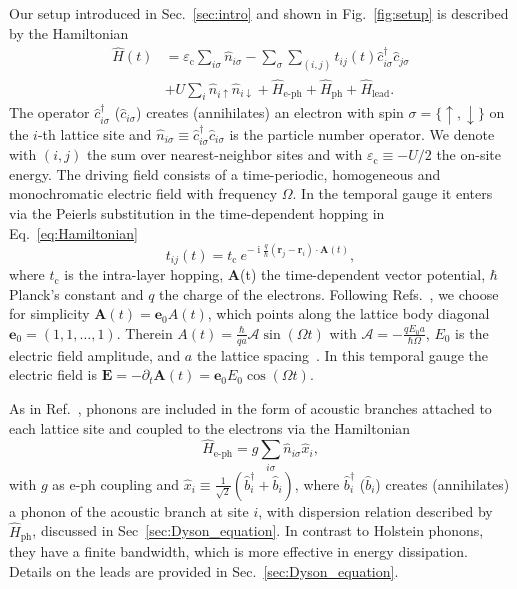 \documentclass[aps,prb,groupedaddress,showpacs,twocolumn,superscriptaddress,10pt]{revtex4-2}
\DeclareMathOperator*{\ii}{i} %
\renewcommand{\vec}[1]{\bm{#1}} %
\newcommand{\aamp}{\mathcal{A}}
\begin{document}
Our setup introduced in Sec.~\ref{sec:intro} and shown in Fig.~\ref{fig:setup} is described by the Hamiltonian
%
\begin{equation}
\label{eq:Hamiltonian}
\begin{split} 
\hat{H}(t)&=\varepsilon_{\text{c}} \sum_{i\sigma}\hat{n}_{i\sigma} -\sum_{\sigma}\sum_{(i,j)} t_{ij}(t) \hat{c}^{\dagger}_{i\sigma} \hat{c}_{j\sigma}
\\ & + U \sum_{i} \hat{n}_{i\uparrow} \hat{n}_{i\downarrow}+\hat{H}_{\text{e-ph}} + \hat{H}_{\text{ph}}+\hat{H}_{\text{lead}}.
\end{split}
\end{equation}
% 
The operator $\hat{c}^{\dagger}_{i\sigma}$ ($\hat{c}_{i\sigma}$) creates (annihilates) an electron with spin $\sigma= \lbrace \uparrow,\downarrow \rbrace$ on the $i$-th lattice site and $\hat{n}_{i\sigma}\equiv \hat{c}^{\dagger}_{i\sigma} \hat{c}_{i\sigma}$ is the particle number operator. We denote with $(i,j)$ the sum over nearest-neighbor sites and with $\varepsilon_{\text{c}} \equiv -U/2$ the on-site energy. The driving field consists of a time-periodic, homogeneous and monochromatic electric field with frequency $\Omega$. In the temporal gauge it enters via the Peierls substitution in the time-dependent hopping in Eq.~\eqref{eq:Hamiltonian}~\cite{peie.33}
% 
\begin{equation}\label{eq:peierls} 
t_{ij}(t) = t_{\text{c}} \ e^{-\ii \frac{q}{\hbar} \left( \vec{r}_j - \vec{r}_i \right) \cdot \vec{A}(t)}, 
\end{equation}
% 
where $t_{\text{c}}$ is the intra-layer hopping, $\vec{A}$(t) the time-dependent vector potential, $\hbar$ Planck's constant and $q$ the charge of the electrons. Following Refs.~\cite{ts.ok.08,mu.we.18}, we choose for simplicity $\vec{A}(t)=\vec{e}_{0} A(t)$, which points along the lattice body diagonal $\vec{e}_{0}=(1,1,\dots,1)$. Therein $A(t)=\frac{\hbar}{qa}\aamp\sin(\Omega t)$ with $\aamp=-\frac{qE_0a}{\hbar\Omega}$, $E_0$ is the electric field amplitude, and $a$ the lattice spacing~\cite{ts.ok.08}. 
In this temporal gauge the electric field is $\vec{E}= -\partial_{t}\vec{A}(t) = \vec{e}_{0}E_0 \cos(\Omega t)$.

As in Ref.~\cite{ma.ga.22}, phonons are included in the form of acoustic  branches attached to each lattice site and coupled to the electrons via the Hamiltonian 
% 
\begin{equation}\label{eq:e-ph_ham} 
\hat{H}_{\text{e-ph}} = g \sum_{i\sigma} \hat{n}_{i\sigma} \hat{x}_{i},
\end{equation}
% 
with $g$ as e-ph coupling and $\hat{x}_{i} \equiv \frac{1}{\sqrt{2}} \left( \hat{b}^{\dagger}_{i} + \hat{b}_i \right)$, where $\hat{b}^{\dagger}_{i}$ ($\hat{b}_{i}$) creates (annihilates) a phonon of the acoustic branch at site $i$, with dispersion relation described by $\hat{H}_{\text{ph}}$, discussed in Sec~\ref{sec:Dyson_equation}. In contrast to Holstein phonons, they have a finite bandwidth, which is more effective in energy dissipation. Details on the leads are provided in Sec.~\ref{sec:Dyson_equation}.    
 
\end{document}
